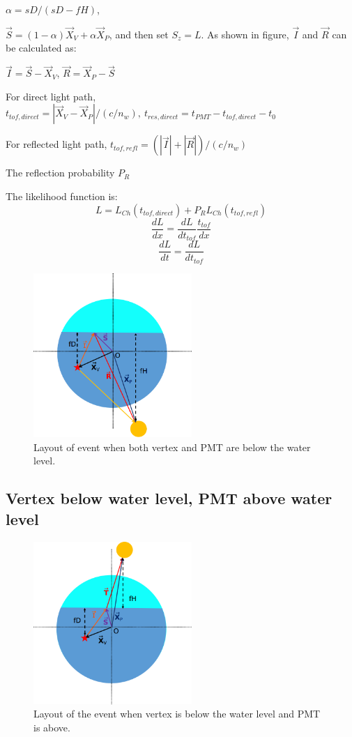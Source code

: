 \documentclass[preprint,12pt]{elsarticle}
\begin{document}
$\alpha = sD/(sD-fH)$, 

$\vec{S} = (1-\alpha)\vec{X}_V+\alpha\vec{X}_P$, and then set $S_z = L$. As shown in figure, 
$\vec{I}$ and $\vec{R}$ can be calculated as:

$\vec{I} = \vec{S}-\vec{X}_V$, $\vec{R} = \vec{X}_P-\vec{S}$ 

For direct light path, $t_{tof,direct} = |\vec{X}_{V}-\vec{X}_{P}|/(c/n_w),~t_{res,direct} = t_{PMT} - t_{tof,direct} - t_0$

For reflected light path, $t_{tof,refl} = (|\vec{I}|+|\vec{R}|)/(c/n_w)$

The reflection probability $P_R$

The likelihood function is:
\[
L = L_{Ch}(t_{tof,direct}) + P_R L_{Ch}(t_{tof,refl})
\]
\[
\frac{dL}{dx} = \frac{dL}{dt_{tof}}\frac{t_{tof}}{dx}
\]
\[
\frac{dL}{dt} = \frac{dL}{dt_{tof}}
\]

\begin{figure}[htbp]
	\centering	
	\includegraphics[width=6cm]{geo_VbPb.png}
	\caption{\label{VbPb} 
	Layout of event when both vertex and PMT are below the water level.
	}
\end{figure}



\subsection{Vertex below water level, PMT above water level}




\begin{figure}[htbp]
	\centering	
	\includegraphics[width=6cm]{geo_VbPt.png}
	\caption{\label{VbPt} 
		Layout of the event when vertex is below the water level and PMT is above.
	}
\end{figure}
\end{document}
